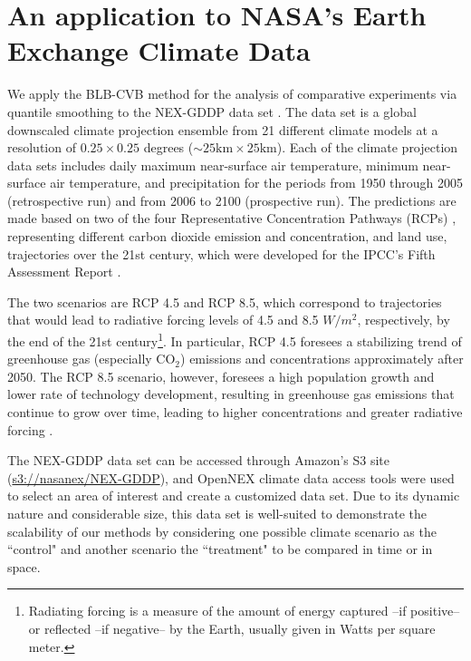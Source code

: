 \documentclass{statsoc}
\begin{document}
\section{An application to NASA's Earth Exchange Climate Data}\label{s6}
We apply the BLB-CVB method for the analysis of comparative experiments via quantile smoothing to the NEX-GDDP data set \citep{thrasher2012bias}. The data set is a global downscaled climate projection ensemble from 21 different climate models at a resolution of $0.25\times 0.25$ degrees ($\sim 25 \text{km}\times 25 \text{km}$). Each of the climate projection data sets includes daily maximum near-surface air temperature, minimum near-surface air temperature, and precipitation for the periods from 1950 through 2005 (retrospective run) and from 2006 to 2100 (prospective run). The predictions are made based on two of the four Representative Concentration Pathways (RCPs) \citep{van2011representative}, representing different carbon dioxide emission and concentration, and land use, trajectories over the 21st century, which were developed for the IPCC's Fifth Assessment Report \citep{IPCCAR5WG1SPM:2013}. 

The two scenarios are RCP 4.5 and RCP 8.5, which correspond to trajectories that would lead to radiative forcing levels of 4.5 and 8.5 $W/m^2$, respectively, by the end of the 21st century\footnote{Radiating forcing is  {a} measure of the amount of energy captured --if positive-- or reflected --if negative-- by the Earth, usually given in Watts per square meter.}. In particular, RCP 4.5 foresees a stabilizing trend of greenhouse gas (especially CO$_2$) emissions and concentrations approximately after 2050. The RCP 8.5 scenario, however, foresees a high population growth and lower rate of technology development, resulting in greenhouse gas emissions that continue to grow over time, leading to higher concentrations and greater radiative forcing \citep{van2011representative}.

The NEX-GDDP data set can be accessed through Amazon's S3 site (\url{s3://nasanex/NEX-GDDP}), and OpenNEX climate data access tools were used to select an area of interest and create a customized data set. Due to its dynamic nature and considerable size, this data set is well-suited to demonstrate the scalability of our methods by considering one possible climate scenario as the ``control" and another scenario the ``treatment" to be compared in time or in space.
\end{document}
